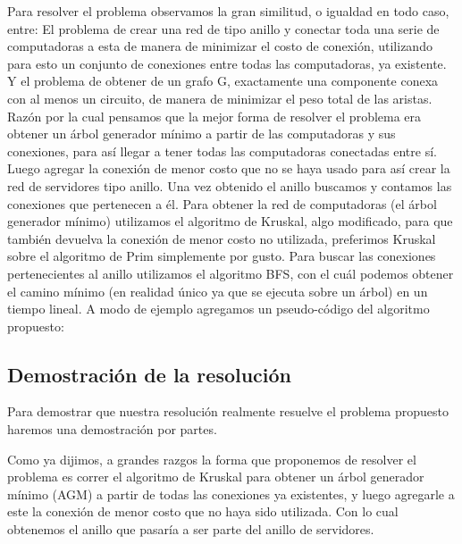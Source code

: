 Para resolver el problema observamos la gran similitud, o igualdad en todo caso, entre:
El problema de crear una red de tipo anillo y conectar toda una serie de computadoras a esta de manera de minimizar el costo de conexión, utilizando para esto un conjunto de conexiones entre todas las computadoras, ya existente.
Y el problema de obtener de un grafo G, exactamente una componente conexa con al menos un circuito, de manera de minimizar el peso total de las aristas. Razón por la cual pensamos que la mejor forma de resolver el problema era obtener un árbol generador mínimo a partir de las computadoras y sus conexiones, para así llegar a tener todas las computadoras conectadas entre sí. Luego agregar la conexión de menor costo que no se haya usado para así crear la red de servidores tipo anillo.
Una vez obtenido el anillo buscamos y contamos las conexiones que pertenecen a \'el.
Para obtener la red de computadoras (el \'arbol generador m\'inimo) utilizamos el algoritmo de Kruskal, algo modificado, para que tambi\'en devuelva la conexi\'on de menor costo no utilizada, preferimos Kruskal sobre el algoritmo de Prim simplemente por gusto. Para buscar las conexiones pertenecientes al anillo utilizamos el algoritmo BFS, con el cu\'al podemos obtener el camino m\'inimo (en realidad \'unico ya que se ejecuta sobre un \'arbol) en un tiempo lineal.
A modo de ejemplo agregamos un pseudo-código del algoritmo propuesto:

\begin{itemize}

\end{itemize}


\newpage


\subsection{Demostraci\'on de la resoluci\'on}

Para demostrar que nuestra resoluci\'on realmente resuelve el problema propuesto haremos una demostraci\'on por partes.

Como ya dijimos, a grandes razgos la forma que proponemos de resolver el problema es correr el algoritmo de Kruskal para obtener un \'arbol generador mínimo (AGM) a partir de todas las conexiones ya existentes, y luego agregarle a este la conexión de menor costo que no haya sido utilizada. Con lo cual obtenemos el anillo que pasaría a ser parte del anillo de servidores.

